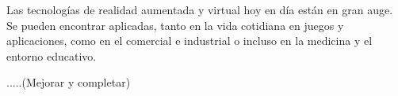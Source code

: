 
Las tecnologías de realidad aumentada y virtual hoy en día están en gran auge. Se pueden encontrar aplicadas, tanto en la vida cotidiana en juegos y aplicaciones, como en el comercial e industrial o incluso en la medicina y el entorno educativo.
 

.....(Mejorar y completar)


